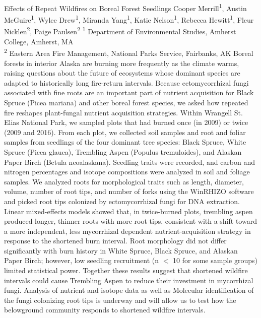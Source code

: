 \makeabstract
    {
    Effects of Repeat Wildfires on Boreal Forest Seedlings
    }
    {
    Cooper Merrill\textsuperscript{1}, Austin McGuire\textsuperscript{1}, Wylee Drew\textsuperscript{1}, Miranda Yang\textsuperscript{1}, Katie Nelson\textsuperscript{1}, Rebecca Hewitt\textsuperscript{1}, Fleur Nicklen\textsuperscript{2}, Paige Paulsen\textsuperscript{2}
    }
    {
    \textsuperscript{1} Department of Environmental Studies, Amherst College, Amherst, MA\\
\textsuperscript{2} Eastern Area Fire Management, National Parks Service, Fairbanks, AK
    }
    {
    Boreal forests in interior Alaska are burning more frequently as the climate warms, raising questions about the future of  ecosystems whose dominant species are adapted to historically long fire-return intervals. Because ectomycorrhizal fungi  associated with fine roots are an important part of nutrient acquisition for Black Spruce (Picea mariana) and other boreal forest species, we asked how repeated fire reshapes plant-fungal nutrient acquisition strategies. 
    }
    {
    Within Wrangell St. Elias National Park, we sampled plots that had burned once (in 2009) or twice (2009 and 2016). From each plot, we collected soil samples and root and foliar samples from seedlings of the four dominant tree species: Black Spruce, White Spruce (Picea glauca), Trembling Aspen (Populus tremuloides), and Alaskan Paper Birch (Betula neoalaskana). Seedling traits were recorded, and carbon and nitrogen percentages and isotope compositions were analyzed in soil and foliage samples. We analyzed roots for morphological traits such as length, diameter, volume, number of root tips, and number of forks using the WinRHIZO software and picked root tips colonized by ectomycorrhizal fungi for DNA extraction.
    }
    {
    Linear mixed-effects models showed that, in twice-burned plots, trembling aspen produced longer, thinner roots with more root tips, consistent with a shift toward a more independent, less mycorrhizal dependent nutrient-acquisition strategy in response to the shortened burn interval. Root morphology did not differ significantly with burn history in White Spruce, Black Spruce, and Alaskan Paper Birch; however, low seedling recruitment (n \ensuremath{<} 10 for some sample groups) limited statistical power. 
    }
    {
    Together these results suggest that shortened wildfire intervals could cause Trembling Aspen to reduce their investment in mycorrhizal fungi. Analysis of nutrient and isotope data  as well as Molecular identification of the fungi colonizing root tips is underway and will allow us to test how the belowground community responds to shortened wildfire intervals.
    }

    \newpage
    